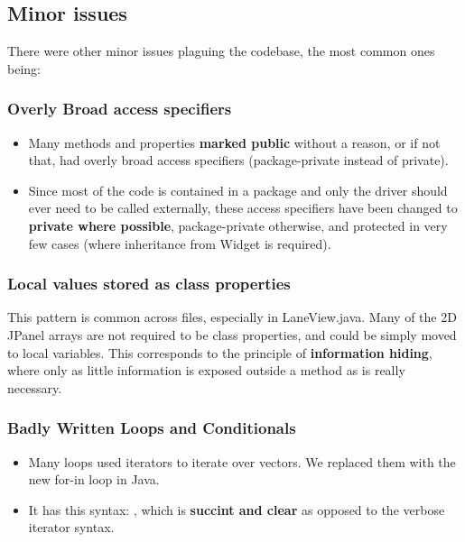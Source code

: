 \subsection{Minor issues}

There were other minor issues plaguing the codebase, the most common ones being:

\subsubsection{Overly Broad access specifiers}

\begin{itemize}

	\item Many methods and properties \textbf{marked public} without a reason, or if not that, had overly broad access specifiers (package-private instead of private).
	\item Since most of the code is contained in a package and only the driver should ever need to be called externally, these access specifiers have been changed to \textbf{private where possible}, package-private otherwise, and protected in very few cases (where inheritance from Widget is required).
\end{itemize}

\subsubsection{Local values stored as class properties}

This pattern is common across files, especially in LaneView.java. Many of the 2D JPanel arrays are not required to be class properties, and could be simply moved to local variables. This corresponds to the principle of \textbf{information hiding}, where only as little information is exposed outside a method as is really necessary.

\subsubsection{Badly Written Loops and Conditionals}

\begin{itemize}
	\item Many loops used iterators to iterate over vectors. We replaced them with the new for-in loop in Java.
	\item It has this syntax: , which is \textbf{succint and clear} as opposed to the verbose iterator syntax.
\end{itemize}

